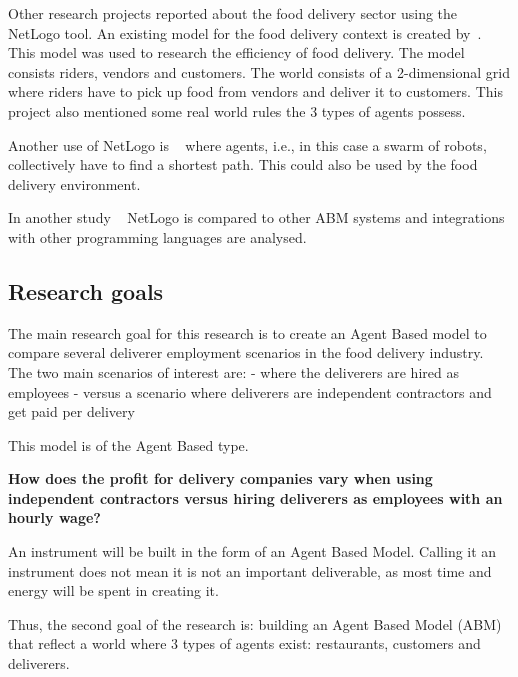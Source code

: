 Other research projects reported about the food delivery sector using the NetLogo tool.
An existing model for the food delivery context is created by~\cite{ismail2024software}.
This model was used to research the efficiency of food delivery.
The model consists riders, vendors and customers.
The world consists of a 2-dimensional grid where riders have to pick up food from vendors and deliver it to customers.
This project also mentioned some real world rules the 3 types of agents possess.

Another use of NetLogo is ~\cite{chella2023quantum} where agents, i.e., in this case a swarm of robots, collectively have to find a shortest path.
This could also be used by the food delivery environment.

In another study ~\cite{antelmi2024reliable} NetLogo is compared to other ABM systems and integrations with other programming languages are analysed.



\subsection{Research goals}

The main research goal for this research is to create an Agent Based model to compare several deliverer employment scenarios  in the food delivery industry.
The two main scenarios of interest are:
    - where the deliverers are hired as employees
    - versus a scenario where deliverers are independent contractors and get paid per delivery

This model is of the Agent Based type.



\cite{hamill2016agent}




\textbf{How does the profit for delivery companies vary when using independent contractors versus hiring deliverers as employees with an hourly wage? }

An instrument will be built in the form of an Agent Based Model.
Calling it an instrument does not mean it is not an important deliverable, as most time and energy will be spent in creating it.

Thus, the second goal of the research is: building an Agent Based Model (ABM) that reflect a world where 3 types of agents exist: restaurants, customers and deliverers.

